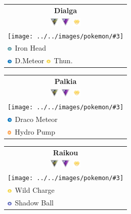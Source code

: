 \documentclass[12pt]{beamer}
\newcommand{\dragonsimp}{\includegraphics[height=0.2cm]{../../images/type/simplified/dragon.png}}
\newcommand{\ghostsimp}{\includegraphics[height=0.2cm]{../../images/type/simplified/ghost.png}}
\newcommand{\electricsimp}{\includegraphics[height=0.2cm]{../../images/type/simplified/electric.png}}
\newcommand{\firesimp}{\includegraphics[height=0.2cm]{../../images/type/simplified/fire.png}}
\newcommand{\steelsimp}{\includegraphics[height=0.2cm]{../../images/type/simplified/steel.png}}
\newcommand{\pokemon}[5]{
\begin{tabular}{p{2.7cm}}
\multicolumn{1}{c}{\textbf{#1}} \\
\multicolumn{1}{c}{#2} \\
\multicolumn{1}{c}{\texttt{[image: ../../images/pokemon/\#3]} } \\
#4 \\ #5 \\  
\end{tabular}
}
\newcommand{\ultraleague}{\includegraphics[width=0.4cm]{../../images/league/ultra_league.png}}
\newcommand{\masterleague}{\includegraphics[width=0.4cm]{../../images/league/master_league.png}}
\newcommand{\raids}{\includegraphics[width=0.4cm]{../../images/league/raids.png}}
\begin{document}
\begin{frame}
\begin{footnotesize}
\begin{block}{}
\begin{center}
\pokemon{Dialga}{\ultraleague~\masterleague~\raids}{dialga}{\steelsimp~Iron Head}{\dragonsimp~D.Meteor \electricsimp~Thun.}
\pokemon{Palkia}{\ultraleague~\masterleague~\raids}{palkia}{\dragonsimp~Draco Meteor}{\firesimp~Hydro Pump}
\pokemon{Raikou}{\ultraleague~\masterleague~\raids}{raikou}{\electricsimp~Wild Charge}{\ghostsimp~Shadow Ball}
\end{center}
\end{block}

\end{footnotesize}
\end{frame}
\end{document}
